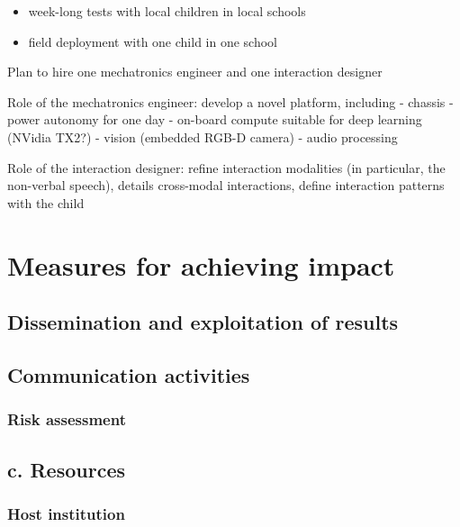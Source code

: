 \documentclass[11pt]{report}
\begin{document}
\begin{itemize}
    \item week-long tests with local children in local schools
    \item field deployment with one child in one school
\end{itemize}


Plan to hire one mechatronics engineer and one interaction designer

Role of the mechatronics engineer: develop a novel platform, including -
chassis - power autonomy for one day - on-board compute suitable for
deep learning (NVidia TX2?) - vision (embedded RGB-D camera) - audio
processing

Role of the interaction designer: refine interaction modalities (in
particular, the non-verbal speech), details cross-modal interactions,
define interaction patterns with the child




\section{Measures for achieving impact}

\subsection{Dissemination and exploitation of results}

\subsection{Communication activities}



\hypertarget{risk-assessment}{%
\subsubsection{Risk assessment}\label{risk-assessment}}

\hypertarget{c.-resources}{%
\subsection{c. Resources}\label{c.-resources}}

\hypertarget{host-institution}{%
\subsubsection{Host institution}\label{host-institution}}
\end{document}

